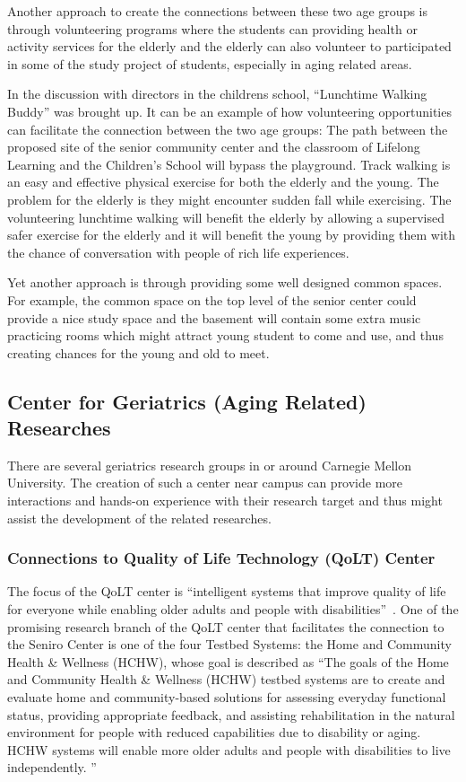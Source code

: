 Another approach to create the connections between these two age
groups is through volunteering programs where the students can
providing health or activity services for the elderly and the elderly
can also volunteer to participated in some of the study project of
students, especially in aging related areas.

In the discussion with directors in the childrens school, ``Lunchtime
Walking Buddy'' was brought up. It can be an example of how
volunteering opportunities can facilitate the connection between the
two age groups: The path between the proposed site of the senior
community center and the classroom of Lifelong Learning and the
Children's School will bypass the playground. Track walking is an easy
and effective physical exercise for both the elderly and the young. The
problem for the elderly is they might encounter sudden fall while
exercising. The volunteering lunchtime walking will benefit the
elderly by allowing a supervised safer exercise for the elderly and it
will benefit the young by providing them with the chance of
conversation with people of rich life experiences.

Yet another approach is through providing some well designed common
spaces. For example, the common space on the top level of the senior
center could provide a nice study space and the basement will contain
some extra music practicing rooms which might attract young student to
come and use, and thus creating chances for the young and old to meet.

\subsection{Center for Geriatrics (Aging Related) Researches}
There are several geriatrics research groups in or around Carnegie
Mellon University. The creation of such a center near campus can
provide more interactions and hands-on experience with their research
target and thus might assist the development of the related
researches.

\subsubsection{Connections to Quality of Life Technology (QoLT) Center}
The focus of the QoLT center is ``intelligent systems that improve
quality of life for everyone while enabling older adults and people
with disabilities''~\cite{QoLT2014}. One of the promising research
branch of the QoLT center that facilitates the connection to the
Seniro Center is one of the four Testbed Systems: the Home and
Community Health \& Wellness (HCHW), whose goal is described as ``The
goals of the Home and Community Health \& Wellness (HCHW) testbed
systems are to create and evaluate home and community-based solutions
for assessing everyday functional status, providing appropriate
feedback, and assisting rehabilitation in the natural environment for
people with reduced capabilities due to disability or aging.  HCHW
systems will enable more older adults and people with disabilities to
live independently. ''~\cite{HCHW}


